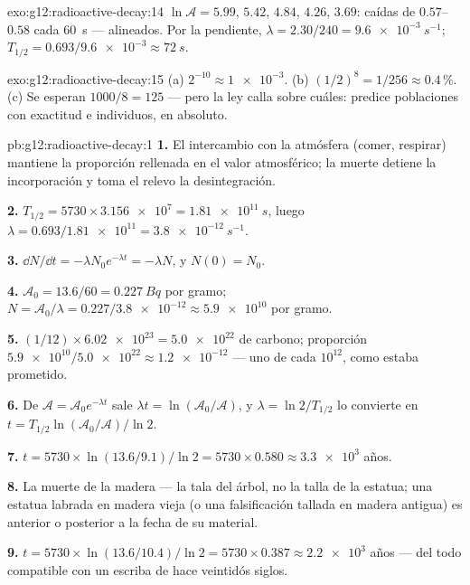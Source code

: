 \begin{solution}{exo:g12:radioactive-decay:14}
$\ln \mathcal A = 5.99$, $5.42$, $4.84$, $4.26$, $3.69$: caídas de
$0.57$--$0.58$ cada \qty{60}{s} --- alineados. Por la pendiente,
$\lambda = 2.30/240 = \qty{9.6e-3}{s^{-1}}$;
$T_{1/2} = 0.693/\num{9.6e-3} \approx \qty{72}{s}$.
\end{solution}

\begin{solution}{exo:g12:radioactive-decay:15}
(a) $2^{-10} \approx \num{1e-3}$. (b) $(1/2)^8 = 1/256 \approx
0.4\,\%$. (c) Se esperan $1000/8 = 125$ --- pero la ley calla sobre
cuáles: predice poblaciones con exactitud e individuos, en absoluto.
\end{solution}

\begin{solution}{pb:g12:radioactive-decay:1}
\textbf{1.} El intercambio con la atmósfera (comer, respirar) mantiene
la proporción rellenada en el valor atmosférico; la muerte detiene la
incorporación y toma el relevo la desintegración.

\textbf{2.} $T_{1/2} = \num{5730} \times \num{3.156e7} =
\qty{1.81e11}{s}$, luego $\lambda = 0.693/\num{1.81e11} =
\qty{3.8e-12}{s^{-1}}$.

\textbf{3.} $\dd N/\dd t = -\lambda N_0 e^{-\lambda t} = -\lambda N$, y
$N(0) = N_0$.

\textbf{4.} $\mathcal A_0 = 13.6/60 = \qty{0.227}{Bq}$ por gramo;
$N = \mathcal A_0/\lambda = 0.227/\num{3.8e-12} \approx \num{5.9e10}$
 por gramo.

\textbf{5.} $(1/12) \times \num{6.02e23} = \num{5.0e22}$  de
carbono; proporción $\num{5.9e10}/\num{5.0e22} \approx \num{1.2e-12}$
--- uno de cada $10^{12}$, como estaba prometido.

\textbf{6.} De $\mathcal A = \mathcal A_0 e^{-\lambda t}$ sale
$\lambda t = \ln(\mathcal A_0/\mathcal A)$, y
$\lambda = \ln 2/T_{1/2}$ lo convierte en
$t = T_{1/2}\ln(\mathcal A_0/\mathcal A)/\ln 2$.

\textbf{7.} $t = \num{5730} \times \ln(13.6/9.1)/\ln 2 =
\num{5730} \times 0.580 \approx \num{3.3e3}$ años.

\textbf{8.} La muerte de la madera --- la tala del árbol, no la talla
de la estatua; una estatua labrada en madera vieja (o una falsificación
tallada en madera antigua) es anterior o posterior a la fecha de su
material.

\textbf{9.} $t = \num{5730} \times \ln(13.6/10.4)/\ln 2 =
\num{5730} \times 0.387 \approx \num{2.2e3}$ años --- del todo
compatible con un escriba de hace veintidós siglos.


\end{solution}
